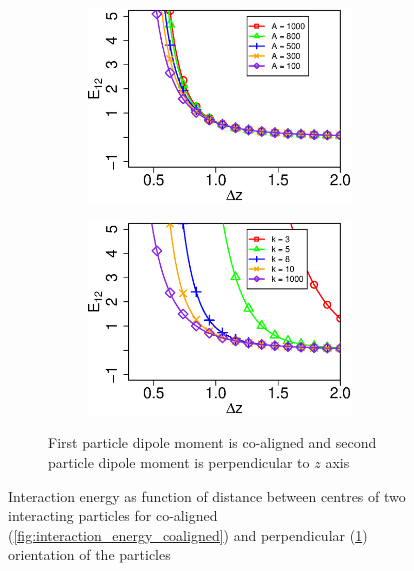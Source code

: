 \documentclass[12pt,a4paper]{article}
\begin{document}
\begin{figure}[h]
\begin{subfigure}{\textwidth}
\begin{subfigure}{.5\textwidth}
	\centering
	\includegraphics[width=.9\textwidth]{k=10_perp}
\end{subfigure}
\begin{subfigure}{.5\textwidth}
	\centering
	\includegraphics[width=.9\textwidth]{A=1000_perp}
\end{subfigure}
	\captionsetup{justification=centering, width=0.7\textwidth, singlelinecheck=false}
	\caption{First particle dipole moment is co-aligned and second particle dipole moment is perpendicular to $z$ axis}
    \label{fig:interaction_energy_counteraligned}
\end{subfigure}
\captionsetup{justification=centering, width=0.8\textwidth}
\caption{Interaction energy as function of distance between centres of two interacting particles for co-aligned (\ref{fig:interaction_energy_coaligned}) and perpendicular (\ref{fig:interaction_energy_counteraligned}) orientation of the particles}
\label{fig:interaction_energy}
\end{figure}
\end{document}
